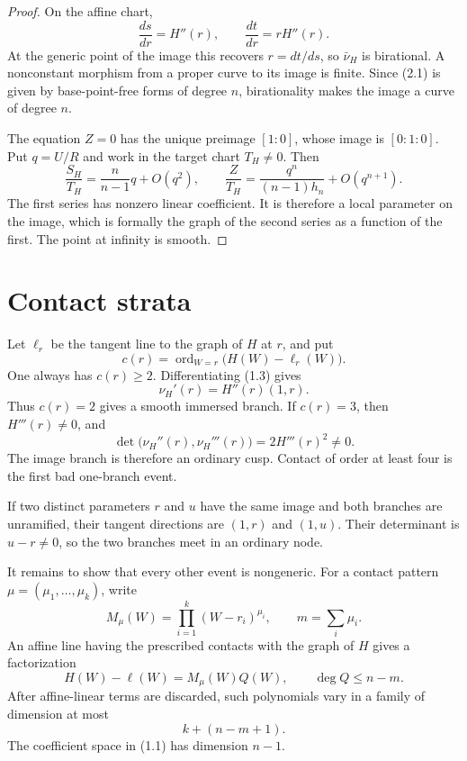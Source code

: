 \documentclass[11pt]{article}
\begin{document}
\begin{proof}
On the affine chart,
\[
  \frac{ds}{dr}=H''(r),\qquad
  \frac{dt}{dr}=rH''(r).
\]
At the generic point of the image this recovers \(r=dt/ds\), so
\(\bar\nu_H\) is birational.  A nonconstant morphism from a proper curve to
its image is finite.  Since (2.1) is given by base-point-free forms of
degree \(n\), birationality makes the image a curve of degree \(n\).

The equation \(Z=0\) has the unique preimage \([1:0]\), whose image is
\([0:1:0]\).  Put \(q=U/R\) and work in the target chart \(T_H\neq0\).
Then
\[
  \frac{S_H}{T_H}=\frac{n}{n-1}q+O(q^2),\qquad
  \frac{Z}{T_H}=\frac{q^n}{(n-1)h_n}+O(q^{n+1}).          \tag{2.2}
\]
The first series has nonzero linear coefficient.  It is therefore a local
parameter on the image, which is formally the graph of the second series as
a function of the first.  The point at infinity is smooth.
\end{proof}

\section{Contact strata}

Let \(\ell_r\) be the tangent line to the graph of \(H\) at \(r\), and put
\[
  c(r)=\operatorname{ord}_{W=r}\bigl(H(W)-\ell_r(W)\bigr).
\]
One always has \(c(r)\geq2\).  Differentiating (1.3) gives
\[
  \nu_H'(r)=H''(r)(1,r).                                 \tag{3.1}
\]
Thus \(c(r)=2\) gives a smooth immersed branch.  If \(c(r)=3\), then
\(H'''(r)\neq0\), and
\[
  \det\bigl(\nu_H''(r),\nu_H'''(r)\bigr)
  =2H'''(r)^2\neq0.                                      \tag{3.2}
\]
The image branch is therefore an ordinary cusp.  Contact of order at least
four is the first bad one-branch event.

If two distinct parameters \(r\) and \(u\) have the same image and both
branches are unramified, their tangent directions are \((1,r)\) and
\((1,u)\).  Their determinant is \(u-r\neq0\), so the two branches meet in
an ordinary node.

It remains to show that every other event is nongeneric.  For a contact
pattern \(\mu=(\mu_1,\ldots,\mu_k)\), write
\[
  M_\mu(W)=\prod_{i=1}^k(W-r_i)^{\mu_i},\qquad
  m=\sum_i\mu_i.
\]
An affine line having the prescribed contacts with the graph of \(H\)
gives a factorization
\[
  H(W)-\ell(W)=M_\mu(W)Q(W),\qquad \deg Q\leq n-m.        \tag{3.3}
\]
After affine-linear terms are discarded, such polynomials vary in a family
of dimension at most
\[
  k+(n-m+1).                                             \tag{3.4}
\]
The coefficient space in (1.1) has dimension \(n-1\).
\end{document}
